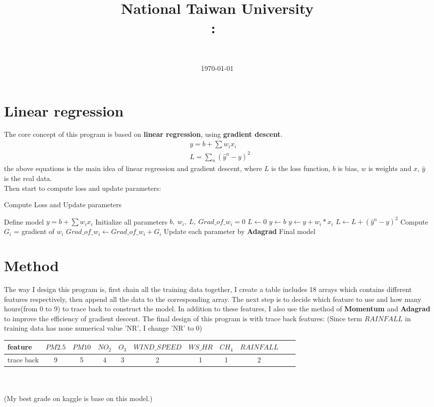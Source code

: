 \documentclass[11pt]{article}
\title{
{National Taiwan University}\\    
    \textmd{\textbf{\Class:\ \Title}}
}
\author{
	\Department \ \AuthorID \\
	\textbf{\AuthorName}
}
\date{
	\today \\
	\horline{1pt}
}
\newcommand\n{\mbox{\qquad}}
\begin{document}
\maketitle

\section{Linear regression}
\n The core concept of this program is based on \textbf{linear regression}, using \textbf{gradient descent}.
\begin{align*}
	&y = b + \sum w_i x_i \\
	&L = \sum_n (\widehat{y}^n - y)^2 
\end{align*}
the above equations is the main idea of linear regression and gradient descent, where $L$ is the loss function, $b$ is bias, $w$ is weights and $x$, $\widehat{y}$ is the real data.
\\ \n Then start to compute loss and update parameters:
\begin{algorithm}[h]
	\caption{Compute Loss and Update parameters}\label{euclid}
	\begin{algorithmic}[1]
		\State Define model $y =  b + \sum w_i x_i $
		\State Initialize all parameters $b,\ w_i,\ L,\ Grad\_of\_w_i = 0$ 		
			\State $L \leftarrow 0$	
				\State $y \leftarrow b$				
					\State $y \leftarrow y + w_i * x_i$	
				\EndFor
				\State $L \leftarrow L + (\widehat{y}^n - y)^2 $
					\State Compute $G_i$ = gradient of $w_i$
					\State $Grad\_of\_w_i \leftarrow Grad\_of\_w_i + G_i$				
				\EndFor			
			\EndFor
			\State Update each parameter by \textbf{Adagrad}
		\EndFor
		\State \Return Final model
	\end{algorithmic}
\end{algorithm}

\section{Method}
\n The way I design this program is, first chain all the training data together, I create a table includes 18 arrays which contains different features respectively, then append all the data to the corresponding array. The next step is to decide which feature to use and how many hours(from 0 to 9) to trace back to construct the model. In addition to these features, I also use the method of \textbf{Momentum} and \textbf{Adagrad} to improve the efficiency of gradient descent. The final design of this program is with trace back features: (Since term $RAINFALL$ in training data has none numerical value 'NR', I change 'NR' to 0)\\
\begin{tabular}[t]{|l|c|c|c|c|c|c|c|c|c|c|}
	\hline
	feature & $PM2.5$ & $PM10$ & $NO_2$ & $O_3$ & $WIND\_SPEED$ & $WS\_HR$ & $CH_4$ & 	$RAINFALL$\\
	\hline 
	trace back & 9 & 5 & 4 & 3 & 2 & 1 & 1 & 2\\
	\hline
\end{tabular} 
\\ \\ 
\n (My best grade on kaggle is base on this model.)
\end{document}
